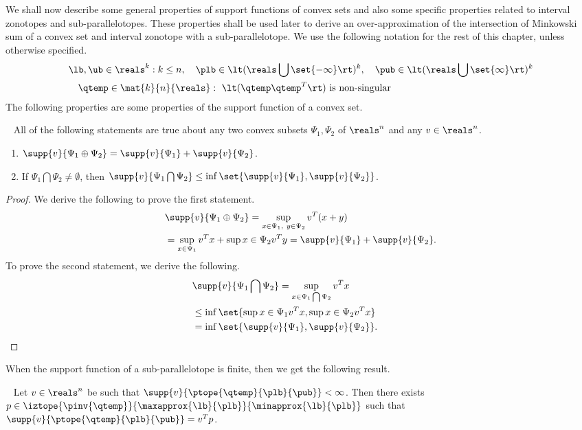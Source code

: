 We shall now describe some general properties of support functions of
convex sets and also some specific properties related to interval
zonotopes and sub-parallelotopes.  These properties shall be used
later to derive an over-approximation of the intersection of Minkowski
sum of a convex set and interval zonotope with a sub-parallelotope.
We use the following notation for the rest of
this chapter, unless otherwise specified.
%
\begin{align*}
& \lb,\ub\in\reals^k:
  k\leq n,~~~\plb\in\lt(\reals\bigcup\set{-\infty}\rt)^k,~~~\pub\in\lt(\reals\bigcup\set{\infty}\rt)^k\\
& ~~~\qtemp\in\mat{k}{n}{\reals}:~\lt(\qtemp\qtemp^T\rt)~\text{is
non-singular}
\end{align*}
%
The following properties are some properties of the support function
of a convex set.
%
\begin{lemma}~\label{lem:gen-supp}
All of the following statements are true about any two convex subsets
$\Psi_1,\Psi_2$ of $\reals^n$ and any $v\in\reals^n$.
%
\begin{enumerate}
\item $\supp{v}{\Psi_1\oplus\Psi_2}=\supp{v}{\Psi_1}+\supp{v}{\Psi_2}$.
\item If $\Psi_1\bigcap\Psi_2\neq\emptyset$, then $\supp{v}{\Psi_1\bigcap\Psi_2}\leq\inf\set{\supp{v}{\Psi_1},\supp{v}{\Psi_2}}$.
\end{enumerate}
%
\end{lemma}
%
\begin{proof}
We derive the following to prove the first statement.
%
\begin{align*}
& \supp{v}{\Psi_1\oplus\Psi_2} =
  \sup_{x\in\Psi_1,~y\in\Psi_2}v^T(x+y)\\
& = \sup_{x\in\Psi_1}v^Tx+\sup{x\in\Psi_2}v^Ty=\supp{v}{\Psi_1}+\supp{v}{\Psi_2}. 
\end{align*}
%
To prove the second statement, we derive the following.
%
\begin{align*}
& \supp{v}{\Psi_1\bigcap\Psi_2}=\sup_{x\in\Psi_1\bigcap\Psi_2}v^Tx\\
& \leq
  \inf\set{\sup{x\in\Psi_1}v^Tx,\sup{x\in\Psi_2}v^Tx}\\
& = \inf\set{\supp{v}{\Psi_1},\supp{v}{\Psi_2}}.~\hspace{3em}\qedhere
\end{align*}
%
\end{proof}
%
When the support function of a sub-parallelotope is finite, then we
get the following result.
%
\begin{lemma}~\label{lem:exist-point}
Let $v\in\reals^n$ be such that
$\supp{v}{\ptope{\qtemp}{\plb}{\pub}}<\infty$.  Then there exists
$p\in\iztope{\pinv{\qtemp}}{\maxapprox{\lb}{\plb}}{\minapprox{\lb}{\plb}}$
  such that $\supp{v}{\ptope{\qtemp}{\plb}{\pub}}=v^Tp$.
\end{lemma}
